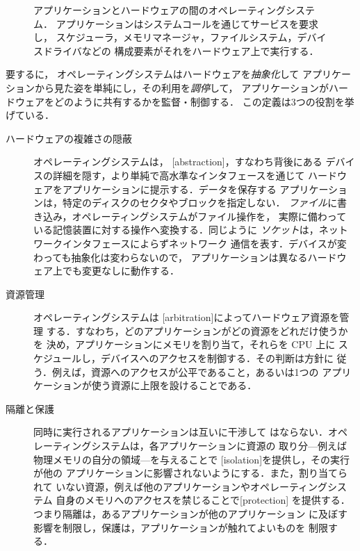 \documentclass[../main.tex]{subfiles}
\begin{document}
\begin{figure}[htbp]
  \centering
  
  \caption{アプリケーションとハードウェアの間のオペレーティングシステム．
    アプリケーションはシステムコールを通じてサービスを要求し，
    スケジューラ，メモリマネージャ，ファイルシステム，デバイスドライバなどの
    構成要素がそれをハードウェア上で実行する．}
  \label{fig:l01-os-layers}
\end{figure}

要するに，%
オペレーティングシステムはハードウェアを\emph{抽象化}して
アプリケーションから見た姿を単純にし，その利用を\emph{調停}して，
アプリケーションがハードウェアをどのように共有するかを監督・制御する．%
この定義は3つの役割を挙げている．
\begin{description}
  \item[ハードウェアの複雑さの隠蔽] オペレーティングシステムは，
    [abstraction]，すなわち背後にある
    デバイスの詳細を隠す，より単純で高水準なインタフェースを通じて
    ハードウェアをアプリケーションに提示する．データを保存する
    アプリケーションは，特定のディスクのセクタやブロックを指定しない．
    \emph{ファイル}に書き込み，オペレーティングシステムがファイル操作を，
    実際に備わっている記憶装置に対する操作へ変換する．同じように
    \emph{ソケット}は，ネットワークインタフェースによらずネットワーク
    通信を表す．デバイスが変わっても抽象化は変わらないので，
    アプリケーションは異なるハードウェア上でも変更なしに動作する．
  \item[資源管理] オペレーティングシステムは
    [arbitration]によってハードウェア資源を管理
    する．すなわち，どのアプリケーションがどの資源をどれだけ使うかを
    決め，アプリケーションにメモリを割り当て，それらを CPU 上に
    スケジュールし，デバイスへのアクセスを制御する．その判断は方針に
    従う．例えば，資源へのアクセスが公平であること，あるいは1つの
    アプリケーションが使う資源に上限を設けることである．
  \item[隔離と保護] 同時に実行されるアプリケーションは互いに干渉して
    はならない．オペレーティングシステムは，各アプリケーションに資源の
    取り分---例えば物理メモリの自分の領域---を与えることで
    [isolation]を提供し，その実行が他の
    アプリケーションに影響されないようにする．また，割り当てられて
    いない資源，例えば他のアプリケーションやオペレーティングシステム
    自身のメモリへのアクセスを禁じることで[protection]%
    を提供する．つまり隔離は，あるアプリケーションが他のアプリケーション
    に及ぼす影響を制限し，保護は，アプリケーションが触れてよいものを
    制限する．
\end{description}
\end{document}
